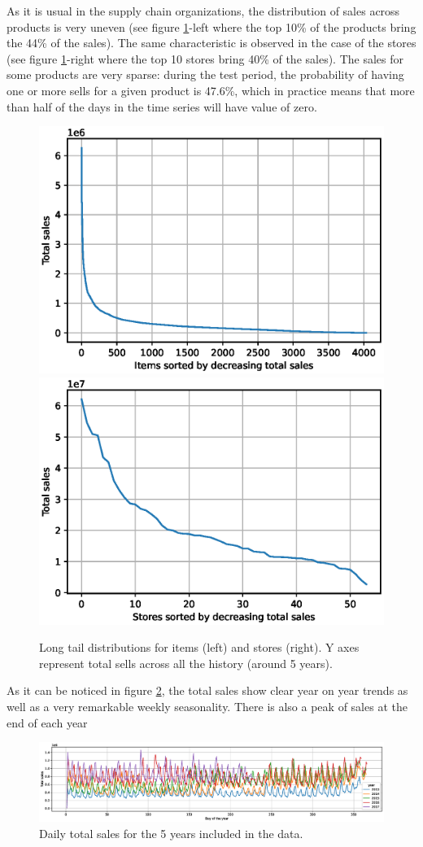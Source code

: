 \documentclass{elsarticle}
\begin{document}
	As it is usual in the supply chain organizations, the distribution of sales across products is very uneven (see figure \ref{fig:tails}-left where the top 10\% of the products bring the 44\% of the sales). The same characteristic is observed in the case of the stores (see figure \ref{fig:tails}-right where the top 10 stores bring 40\% of the sales). The sales for some products are very sparse: during the test period, the probability of having one or more sells for a given product is 47.6\%, which in practice means that more than half of the days in the time series will have value of zero.
	
	\begin{figure}
		\centering
		\includegraphics[width=0.48\linewidth]{img/items_tail}
		\includegraphics[width=0.48\linewidth]{img/stores_tail}
		\caption{Long tail distributions for items (left) and stores (right). Y axes represent total sells across all the history (around 5 years).}
		\label{fig:tails}
	\end{figure}
	
	 As it can be noticed in figure \ref{fig:timeseries}, the total sales show clear year on year trends as well as a very remarkable weekly seasonality. There is also a peak of sales at the end of each year
	 
	 	\begin{figure}
	 	\centering
	 	\includegraphics[width=1\textwidth]{img/timeseries}
	 	\caption{Daily total sales for the 5 years included in the data.}
	 	\label{fig:timeseries}
	 \end{figure}
	
\end{document}
